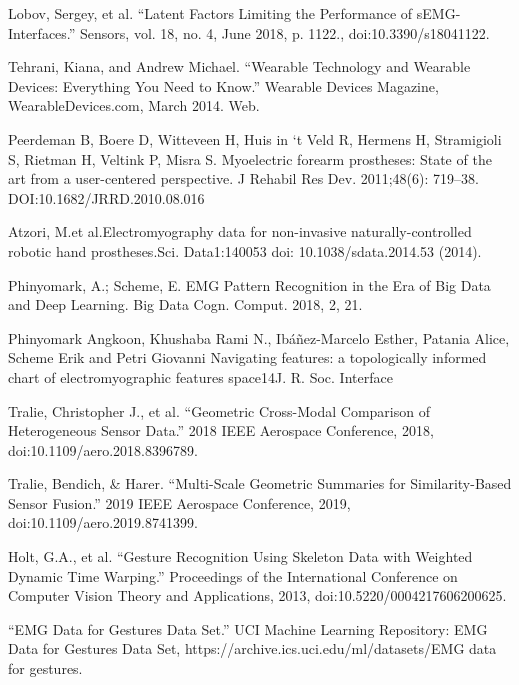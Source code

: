 \documentclass[11pt]{article}
\begin{document}
\begin{thebibliography}{5}

 Lobov, Sergey, et al. “Latent Factors Limiting the Performance of sEMG-Interfaces.” Sensors, vol. 18, no. 4, June 2018, p. 1122., doi:10.3390/s18041122.

 Tehrani, Kiana, and Andrew Michael. “Wearable Technology and Wearable Devices: Everything You Need to Know.” Wearable Devices Magazine, WearableDevices.com, March 2014. Web.

 Peerdeman  B,  Boere  D,  Witteveen  H,  Huis  in  ‘t  Veld  R,  Hermens H, Stramigioli S, Rietman H, Veltink P, Misra S. Myoelectric  forearm  prostheses:  State  of  the  art  from  a  user-centered perspective. J Rehabil Res Dev. 2011;48(6): 719–38. DOI:10.1682/JRRD.2010.08.016

 Atzori, M.et al.Electromyography data for non-invasive naturally-controlled robotic hand prostheses.Sci. Data1:140053 doi: 10.1038/sdata.2014.53 (2014).

 Phinyomark, A.; Scheme, E. EMG Pattern Recognition in the Era of Big Data and Deep Learning. Big Data Cogn. Comput. 2018, 2, 21. 

 Phinyomark Angkoon, Khushaba Rami N., Ibáñez-Marcelo Esther, Patania Alice, Scheme Erik and Petri Giovanni Navigating features: a topologically informed chart of electromyographic features space14J. R. Soc. Interface

 Tralie, Christopher J., et al. “Geometric Cross-Modal Comparison of Heterogeneous Sensor Data.” 2018 IEEE Aerospace Conference, 2018, doi:10.1109/aero.2018.8396789.

 Tralie, Bendich, \& Harer. “Multi-Scale Geometric Summaries for Similarity-Based Sensor Fusion.” 2019 IEEE Aerospace Conference, 2019, doi:10.1109/aero.2019.8741399.

 Holt, G.A., et al. “Gesture Recognition Using Skeleton Data with Weighted Dynamic Time Warping.” Proceedings of the International Conference on Computer Vision Theory and Applications, 2013, doi:10.5220/0004217606200625.

 “EMG Data for Gestures Data Set.” UCI Machine Learning Repository: EMG Data for Gestures Data Set, https://archive.ics.uci.edu/ml/datasets/EMG data for gestures.

\end{thebibliography}
  
\end{document}
